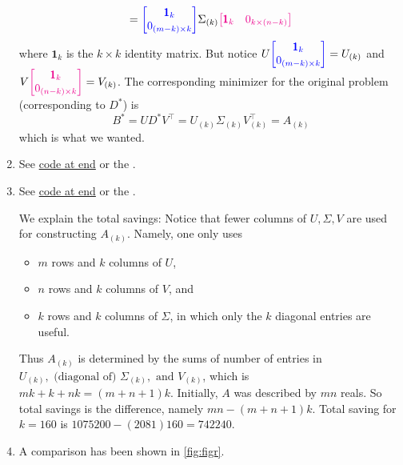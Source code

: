 \begin{enumerate}[leftmargin=*]
$$={\color{blue}\begin{bmatrix}
\pmb 1_{k} \\0_{(m-k)\times k}
\end{bmatrix}}
\Sigma_{(k)}
{\color{magenta}\begin{bmatrix}
\pmb 1_{k} & 0_{k\times(n-k)}
\end{bmatrix}}
$$ where $\pmb 1_k$ is the $k\times k$ identity matrix. But notice $U{\color{blue}\begin{bmatrix}
\pmb 1_{k} \\0_{(m-k)\times k}
\end{bmatrix}} = U_{(k)}$ and $V{\color{magenta}\begin{bmatrix}
\pmb 1_{k} \\ 0_{(n-k)\times k}
\end{bmatrix}} = V_{(k)}$.
The corresponding minimizer for the original problem (corresponding to $D^*$) is $$B^*=UD^*V^\top = U_{(k)}\Sigma_{(k)}V_{(k)}^\top = A_{(k)}$$ which is what we wanted.
\item See \hyperref[pdf:imgcom]{code at end} or the .

\item 
See \hyperref[pdf:imgcom]{code at end} or the .

We explain the total savings:
Notice that fewer columns of $U,\Sigma,V$ are used for constructing $A_{(k)}$. Namely, one only uses \begin{itemize}
\item $m$ rows and $k$ columns of $U$,
\item $n$ rows and $k$ columns of $V$, and
\item $k$ rows and $k$ columns of $\Sigma$, in which only the $k$ diagonal entries are useful.
\end{itemize}
Thus $A_{{(k)}}$ is determined by the sums of number of entries in $U_{(k)}, \text{ (diagonal of) }\Sigma_{(k)}, \text{ and }V_{(k)}$, which is $mk+k+nk = (m+n+1)k$. Initially, $A$ was described by $mn$ reals. So total savings is the difference, namely $mn-(m+n+1)k$. Total saving for $k=160$ is $1075200 - (2081)160 = 742240$.
\item A comparison has been shown in \cref{fig:figr}.
\end{enumerate}












\newpage
\pb

